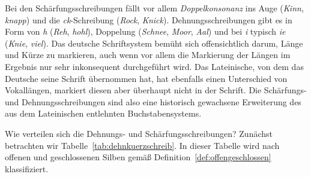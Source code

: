 Bei den Schärfungsschreibungen fällt vor allem \textit{Doppelkonsonanz} ins Auge (\textit{Kinn}, \textit{knapp}) und die \textit{ck}-Schreibung (\textit{Rock}, \textit{Knick}).
Dehnungsschreibungen gibt es in Form von \textit{h} (\textit{Reh}, \textit{hohl}), Doppelung (\textit{Schnee}, \textit{Moor}, \textit{Aal}) und bei \textit{i} typisch \textit{ie} (\textit{Knie}, \textit{viel}).
Das deutsche Schriftsystem bemüht sich offensichtlich darum, Länge und Kürze zu markieren, auch wenn vor allem die Markierung der Längen im Ergebnis nur sehr inkonsequent durchgeführt wird.
Das Lateinische, von dem das Deutsche seine Schrift übernommen hat, hat ebenfalls einen Unterschied von Vokallängen, markiert diesen aber überhaupt nicht in der Schrift.
Die Schärfungs- und Dehnungsschreibungen sind also eine historisch gewachsene Erweiterung des aus dem Lateinischen entlehnten Buchstabensystems.

Wie verteilen sich die Dehnungs- und Schärfungsschreibungen?
Zunächst betrachten wir Tabelle~\ref{tab:dehnkuerzschreib}.
In dieser Tabelle wird nach offenen und geschlossenen Silben gemäß Definition~\ref{def:offengeschlossen} klassifiziert.

